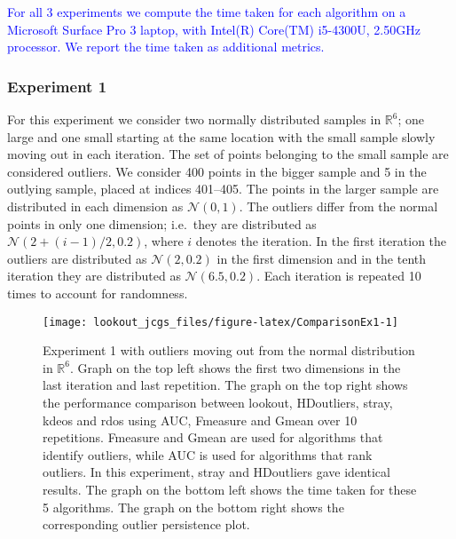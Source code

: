 \documentclass[12pt]{article}
\theoremstyle{definition}
\theoremstyle{definition}
\theoremstyle{definition}
\theoremstyle{remark}
\begin{document}
\textcolor{blue}{For all 3 experiments we compute the time taken for each algorithm on a Microsoft Surface Pro 3 laptop, with Intel(R) Core(TM) i5-4300U, 2.50GHz processor. We report the time taken as additional metrics.}

\hypertarget{experiment-1}{%
\subsubsection*{Experiment 1}\label{experiment-1}}

For this experiment we consider two normally distributed samples in \(\mathbb{R}^6\); one large and one small starting at the same location with the small sample slowly moving out in each iteration. The set of points belonging to the small sample are considered outliers. We consider 400 points in the bigger sample and 5 in the outlying sample, placed at indices 401--405. The points in the larger sample are distributed in each dimension as \(\mathcal{N}(0, 1)\). The outliers differ from the normal points in only one dimension; i.e.~they are distributed as \(\mathcal{N}\left(2 + (i-1)/2, 0.2 \right)\), where \(i\) denotes the iteration. In the first iteration the outliers are distributed as \(\mathcal{N}\left(2, 0.2 \right)\) in the first dimension and in the tenth iteration they are distributed as \(\mathcal{N}\left(6.5, 0.2 \right)\). Each iteration is repeated 10 times to account for randomness.

\begin{figure}
\texttt{[image: lookout\_jcgs\_files/figure-latex/ComparisonEx1-1]} \caption{Experiment 1 with outliers moving out from the normal distribution in $\mathbb{R}^6$. Graph on the top left shows the first two dimensions in the last iteration and last repetition.  The graph on the top right shows the performance comparison between lookout, HDoutliers, stray, kdeos and rdos using AUC, Fmeasure and Gmean over 10 repetitions. Fmeasure and Gmean are used for algorithms that identify outliers, while AUC is used for algorithms that rank outliers. In this experiment, stray and HDoutliers gave identical results. The graph on the bottom left shows the time taken for these 5 algorithms. The graph on the bottom right shows the corresponding outlier persistence plot.}\label{fig:ComparisonEx1}
\end{figure}
\end{document}
